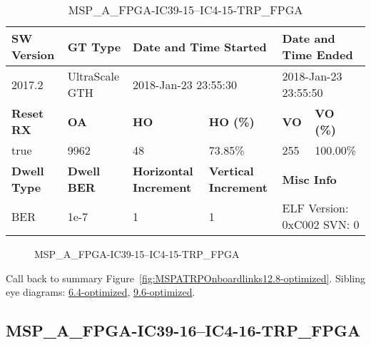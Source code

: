 \begin{table}[h]
\centering
\caption{MSP\_A\_FPGA-IC39-15--IC4-15-TRP\_FPGA}
\label{tab:MSPAFPGAIC3915IC415TRPFPGA12.8-optimized}
\begin{tabular}{@{}|l|l|l|l|l|l|@{}}
\toprule
\textbf{SW Version}                & \textbf{GT Type}   & \multicolumn{2}{l|}{\textbf{Date and Time Started}}            & \multicolumn{2}{l|}{\textbf{Date and Time Ended}}        \\ \midrule
2017.2                       & UltraScale GTH          & \multicolumn{2}{l|}{2018-Jan-23 23:55:30}                   & \multicolumn{2}{l|}{2018-Jan-23 23:55:50}               \\ \midrule
\textbf{Reset RX}                  & \textbf{OA} & \textbf{HO}   & \textbf{HO (\%)} & \textbf{VO} & \textbf{VO (\%)} \\ \midrule
true & 9962        & 48          & 73.85\%        & 255        & 100.00\%       \\ \midrule
\textbf{Dwell Type}                & \textbf{Dwell BER} & \textbf{Horizontal Increment} & \textbf{Vertical Increment}    & \multicolumn{2}{l|}{\textbf{Misc Info}}                  \\ \midrule
BER                            & 1e-7        & 1        & 1           & \multicolumn{2}{l|}{ELF Version: 0xC002 SVN: 0}                         \\ \bottomrule
\end{tabular}
\end{table}

\begin{figure}[h]
\caption{MSP\_A\_FPGA-IC39-15--IC4-15-TRP\_FPGA} \label{fig:MSPAFPGAIC3915IC415TRPFPGA12.8-optimized}
\end{figure}

Call back to summary Figure~\ref{fig:MSPATRPOnboardlinks12.8-optimized}.
Sibling eye diagrams: \hyperref[sec:MSPAFPGAIC3915IC415TRPFPGA6.4-optimized]{6.4-optimized}, \hyperref[sec:MSPAFPGAIC3915IC415TRPFPGA9.6-optimized]{9.6-optimized}.

\clearpage
\newpage


\subsection{MSP\_A\_FPGA-IC39-16--IC4-16-TRP\_FPGA}\label{sec:MSPAFPGAIC3916IC416TRPFPGA12.8-optimized}

